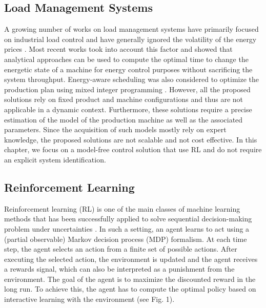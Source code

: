 \subsection{Load Management Systems}

A growing number of works on load management systems have primarily focused on industrial load control and have generally ignored the volatility of the energy prices \cite{Gholian7236921, CHEN2015263, Wang6345296, MIDDELBERG20091266}. Most recent works \cite{Sun6329376, DUFLOU2012587, Bakakeu8607483, Pechmann2011} took into account this factor and showed that analytical approaches can be used to compute the optimal time to change the energetic state of a machine for energy control purposes without sacrificing the system throughput. Energy-aware scheduling was also considered to optimize the production plan using mixed integer programming \cite{BRUZZONE2012459, FANG2011234}. However, all the proposed solutions rely on fixed product and machine configurations and thus are not applicable in a dynamic context. Furthermore, these solutions require a precise estimation of the model of the production machine as well as the associated parameters. Since the acquisition of such models mostly rely on expert knowledge, the proposed solutions are not scalable and not cost effective. In this chapter, we focus on a model-free control solution that use RL and do not require an explicit system identification.

\subsection{Reinforcement Learning}
Reinforcement learning (RL) is one of the main classes of machine learning methods that has been successfully applied to solve sequential decision-making problem under uncertainties \cite{Liu6918520}. In such a setting, an agent learns to act using a (partial observable) Markov decision process (MDP) \cite{Sutton9780262039246} formalism. At each time step, the agent selects an action from a finite set of possible actions. After executing the selected action, the environment is updated and the agent receives a rewards signal, which can also be interpreted as a punishment from the environment. The goal of the agent is to maximize the discounted reward in the long run. To achieve this, the agent has to compute the optimal policy based on interactive learning with the environment (see Fig. 1).

